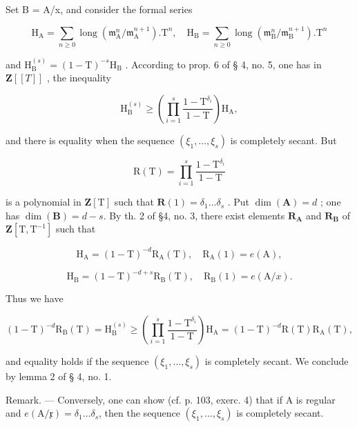 Set B = A/x, and consider the formal series

\[
\mathrm{H} _ {\mathrm{A}} = \sum_ {n \geqslant 0} \operatorname{long} (\mathfrak {m} _ {\mathrm{A}} ^ {n} / \mathfrak {m} _ {\mathrm{A}} ^ {n + 1}). \mathrm{T} ^ {n}, \quad \mathrm{H} _ {\mathrm{B}} = \sum_ {n \geqslant 0} \operatorname{long} (\mathfrak {m} _ {\mathrm{B}} ^ {n} / \mathfrak {m} _ {\mathrm{B}} ^ {n + 1}). \mathrm{T} ^ {n}
\]

and \(\mathrm{H}_{\mathrm{B}}^{(s)} = (1 - \mathrm{T})^{-s}\mathrm{H}_{\mathrm{B}}\) . According to prop. 6 of § 4, no. 5, one has in \(\mathbf{Z}[[T]]\) , the inequality

\[
\mathrm{H} _ {\mathrm{B}} ^ {(s)} \geqslant \left(\prod_ {i = 1} ^ {s} \frac {1 - \mathrm{T} ^ {\delta_ {i}}}{1 - \mathrm{T}}\right) \mathrm{H} _ {\mathrm{A}},
\]

and there is equality when the sequence \((\xi_{1}, \ldots, \xi_{s})\) is completely secant. But

\[
\mathrm{R(T)} = \prod_ {i = 1} ^ {s} \frac {1 - \mathrm{T} ^ {\delta_ {i}}}{1 - \mathrm{T}}
\]

is a polynomial in \(\mathbf{Z}[\mathrm{T}]\) such that \(\mathbf{R}(1) = \delta_1 \ldots \delta_s\) . Put \(\dim(\mathbf{A}) = d\) ; one has \(\dim(\mathbf{B}) = d - s\). By th. 2 of §4, no. 3, there exist elements \(\mathbf{R}_{\mathbf{A}}\) and \(\mathbf{R}_{\mathbf{B}}\) of \(\mathbf{Z}[\mathrm{T}, \mathrm{T}^{-1}]\) such that

\[
\mathrm{H} _ {\mathrm{A}} = (1 - \mathrm{T}) ^ {- d} \mathrm{R} _ {\mathrm{A}} (\mathrm{T}), \quad \mathrm{R} _ {\mathrm{A}} (1) = e (\mathrm{A}),
\]

\[
\mathrm{H} _ {\mathrm{B}} = (1 - \mathrm{T}) ^ {- d + s} \mathrm{R} _ {\mathrm{B}} (\mathrm{T}), \quad \mathrm{R} _ {\mathrm{B}} (1) = e (\mathrm{A} / x).
\]

Thus we have

\[
(1 - \mathrm{T}) ^ {- d} \mathrm{R} _ {\mathrm{B}} (\mathrm{T}) = \mathrm{H} _ {\mathrm{B}} ^ {(s)} \geqslant \left(\prod_ {i = 1} ^ {s} \frac {1 - \mathrm{T} ^ {\delta_ {i}}}{1 - \mathrm{T}}\right) \mathrm{H} _ {\mathrm{A}} = (1 - \mathrm{T}) ^ {- d} \mathrm{R} (\mathrm{T}) \mathrm{R} _ {\mathrm{A}} (\mathrm{T}),
\]

and equality holds if the sequence \((\xi_{1},\ldots,\xi_{s})\) is completely secant. We conclude by lemma 2 of § 4, no. 1.

Remark. --- Conversely, one can show (cf. p. 103, exerc. 4) that if A is regular and \(e(\mathrm{A}/\mathfrak{x})=\delta_{1}\ldots\delta_{s}\), then the sequence \((\xi_{1},\ldots,\xi_{s})\) is completely secant.

